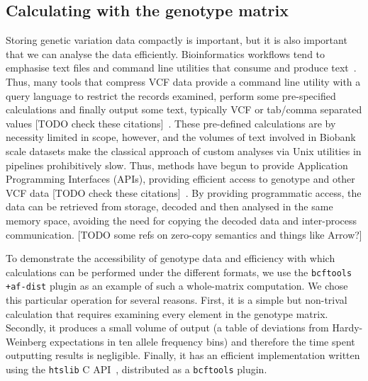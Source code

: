 \documentclass[a4paper,num-refs]{oup-contemporary}
\begin{document}
\subsection{Calculating with the genotype matrix}
Storing genetic variation data compactly is important, but it is also
important that we can analyse the data efficiently. Bioinformatics 
workflows tend to emphasise text files and command line utilities 
that consume and produce text~\citep[e.g.][]{buffalo2015bioinformatics}. 
Thus, many tools that compress VCF data provide a command line 
utility with a query language to restrict the records
examined, perform some pre-specified calculations and finally 
output some text, typically VCF or tab/comma separated values
[TODO check these citations]~\citep{
layer2016efficient, %
li2016bgt, %
tatwawadi2016gtrac, %
danek2018gtc, %
lin2020sparse, %
lan2020genozip,lan2021genozip, %
lefaive2021sparse, %
wertenbroek2022xsi,%
zhang2023gbc}. %
These pre-defined calculations are by necessity limited in scope, however,
and the volumes of text involved in Biobank scale datasets
make the classical approach of custom
analyses via Unix utilities in pipelines prohibitively slow. Thus, 
methods have begun to provide Application Programming Interfaces
(APIs), providing efficient access to genotype and other VCF data
[TODO check these citations]~\cite[e.g.][]{kelleher2013processing,lefaive2021sparse,
wertenbroek2022xsi,zhang2023gbc}. By providing programmatic access,
the data can be retrieved from storage, decoded and then analysed
in the same memory space, avoiding the need for copying
the decoded data and inter-process communication. [TODO some refs
on zero-copy semantics and things like Arrow?]

To demonstrate the accessibility of genotype data and efficiency with 
which calculations can be performed under the different formats,
we use the \texttt{bcftools +af-dist} plugin as an example of such a whole-matrix
computation. 
We chose this particular operation for several
reasons. First, it is a simple but non-trival calculation that requires 
examining every element in the genotype matrix.
Secondly, it produces a small volume of output (a table of
deviations from Hardy-Weinberg expectations in ten allele frequency
bins) and therefore the time spent outputting results is negligible.
Finally, it has an efficient implementation written using the 
\texttt{htslib} C API~\citep{bonfield2021htslib}, distributed as 
a \texttt{bcftools} plugin. 
\end{document}
